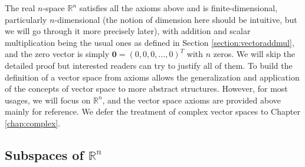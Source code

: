 The real $n$-space $\mathbb{R}^n$ satisfies all the axioms above and is finite-dimensional, particularly $n$-dimensional (the notion of dimension here should be intuitive, but we will go through it more precisely later), with addition and scalar multiplication being the usual ones as defined in Section \ref{section:vectoraddmul}, and the zero vector is simply $\textbf{0} = (0,0,0,\ldots,0)^T$ with $n$ zeros. We will skip the detailed proof but interested readers can try to justify all of them. To build the definition of a vector space from axioms allows the generalization and application of the concepts of vector space to more abstract structures. However, for most usages, we will focus on $\mathbb{R}^n$, and the vector space axioms are provided above mainly for reference. We defer the treatment of complex vector spaces to Chapter \ref{chap:complex}.

\subsection{Subspaces of $\mathbb{R}^n$}

